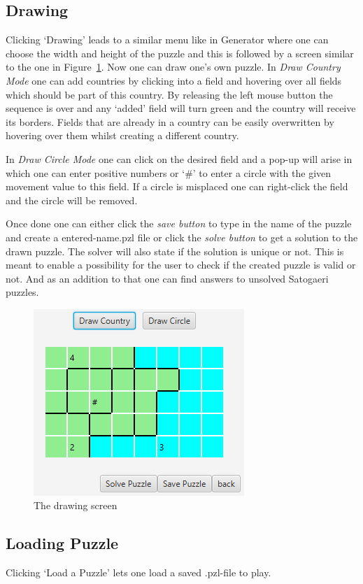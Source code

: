 \subsection{Drawing} Clicking `Drawing' leads to a similar menu like in Generator where one can choose the width and height of the puzzle and this is followed by a screen similar to the one in Figure~\ref{fig:drawing_screen}.
Now one can draw one's own puzzle. In \emph{Draw Country Mode} one can add countries by clicking into a field and hovering over all fields which should be part of this country. By releasing the left mouse button the sequence is over and any `added' field will turn green and the country will receive its borders. Fields that are already in a country can be easily overwritten by hovering over them whilst creating a different country.

In \emph{Draw Circle Mode} one can click on the desired field and a pop-up will arise in which one can enter positive numbers or `\#' to enter a circle with the given movement value to this field. If a circle is misplaced one can right-click the field and the circle will be removed.

Once done one can either click the \emph{save button} to type in the name of the puzzle and create a entered-name.pzl file or click the \emph{solve button} to get a solution to the drawn puzzle. The solver will also state if the solution is unique or not. This is meant to enable a possibility for the user to check if the created puzzle is valid or not. And as an addition to that one can find answers to unsolved Satogaeri puzzles.
\begin{figure}
  \centering
  \includegraphics[scale=1]{Pictures/drawing_screen.png} 
  \caption{The drawing screen}
  \label{fig:drawing_screen}
\end{figure}

\subsection{Loading Puzzle} Clicking `Load a Puzzle' lets one load a saved .pzl-file to play.

